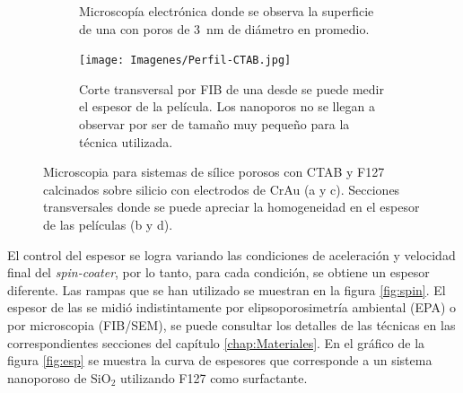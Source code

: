 \begin{figure}[th]
\begin{subfigure}[t]{0.49\textwidth}
			       		\caption{Microscopía electrónica donde se observa la superficie de una \pdmC\space con poros de \SI{3}{nm} de diámetro en promedio.}
			       		\label{fig:sem_homogeneidad3}
			       		\end{subfigure}
					\begin{subfigure}[t]{0.49\textwidth}
			 	   	    \texttt{[image: Imagenes/Perfil-CTAB.jpg]}
			       		\caption{Corte transversal por FIB de una \pdmC\space desde se puede medir el espesor de la película. Los nanoporos no se llegan a observar por ser de tamaño muy pequeño para la técnica utilizada.}
			       		\label{fig:sem_homogeneidad4}
			       		\end{subfigure}	
					 \caption[MEB \pdmC\space y \pdmF.]{Microscopia para sistemas de sílice porosos con CTAB y F127 calcinados sobre silicio con electrodos de Cr\textbar Au (a y c). Secciones transversales donde se puede apreciar la homogeneidad en el espesor de las películas (b y d).}
					 \label{fig:sem_homogeneidad}	
				     \vspace*{0.2cm}
				     \end{figure}

		El control del espesor se logra variando las condiciones de aceleración y velocidad final del \textit{spin-coater}, por lo tanto, para cada condición, se obtiene un espesor diferente. Las rampas que se han utilizado se muestran en la figura \ref{fig:spin}. El espesor de las \pdm\space se midió indistintamente por elipsoporosimetría ambiental (EPA) o por microscopia (FIB/SEM), se puede consultar los detalles de las técnicas en las correspondientes secciones del capítulo \ref{chap:Materiales}. En el gráfico de la figura \ref{fig:esp} se muestra la curva de espesores que corresponde a un sistema nanoporoso de SiO$_2$ utilizando F127 como surfactante. 

